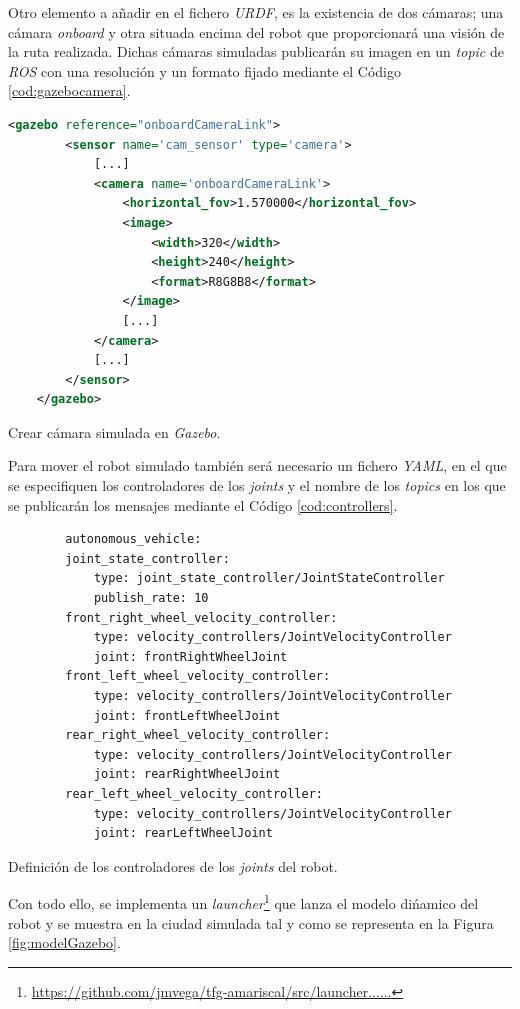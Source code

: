 Otro elemento a añadir en el fichero \textit{URDF}, es la existencia de dos cámaras; una cámara \textit{onboard} y otra situada encima del robot que proporcionará una visión de la
ruta realizada. Dichas cámaras simuladas publicarán su imagen en un \textit{topic} de \textit{ROS} con una resolución y un formato fijado mediante el Código
\ref{cod:gazebocamera}.\\

\begin{code}[h]
	\begin{lstlisting}[language=XML]
	<gazebo reference="onboardCameraLink">
		<sensor name='cam_sensor' type='camera'>
			[...]
			<camera name='onboardCameraLink'>
				<horizontal_fov>1.570000</horizontal_fov>
				<image>
					<width>320</width>
					<height>240</height>
					<format>R8G8B8</format>
				</image>
				[...]
			</camera>
			[...]
		</sensor>
	</gazebo>
	\end{lstlisting}
	\caption[Crear cámara simulada en \textit{Gazebo}.]{Crear cámara simulada en \textit{Gazebo}.}
	\label{cod:gazebocamera}
\end{code}

Para mover el robot simulado también será necesario un fichero \textit{YAML}, en el que se especifiquen los controladores de los \textit{joints} y el nombre de los \textit{topics}
en los que se publicarán los mensajes mediante el Código \ref{cod:controllers}.\\

\begin{code}[h]
	\begin{lstlisting}
		autonomous_vehicle:
		joint_state_controller:
			type: joint_state_controller/JointStateController
			publish_rate: 10
		front_right_wheel_velocity_controller:
			type: velocity_controllers/JointVelocityController
			joint: frontRightWheelJoint
		front_left_wheel_velocity_controller:
			type: velocity_controllers/JointVelocityController
			joint: frontLeftWheelJoint
		rear_right_wheel_velocity_controller:
			type: velocity_controllers/JointVelocityController
			joint: rearRightWheelJoint
		rear_left_wheel_velocity_controller:
			type: velocity_controllers/JointVelocityController
			joint: rearLeftWheelJoint
	\end{lstlisting}
	\caption[Definición de los controladores de los \textit{joints} del robot.]{Definición de los controladores de los \textit{joints} del robot.}
	\label{cod:controllers}
\end{code}

Con todo ello, se implementa un \textit{launcher}\footnote{\url{https://github.com/jmvega/tfg-amariscal/src/launcher......}} que lanza el modelo dińamico del robot y se muestra en
la ciudad simulada tal y como se representa en la Figura \ref{fig:modelGazebo}.\\

